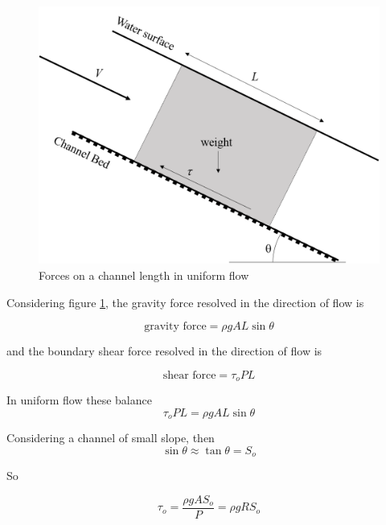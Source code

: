 \documentclass[a4paper, 12pt, british]{article} %
\numberwithin{equation}{section}
\numberwithin{figure}{section}
\numberwithin{table}{section}
\begin{document}
\begin{figure}[H]
	\centering
	\includegraphics[scale=0.5]{./images/uniform_flow_section_2018.png}
	\caption{Forces on a channel length in uniform flow}
	\label{fig:171}
\end{figure} 
Considering figure \ref{fig:171}, the gravity force resolved in the direction of flow is

\begin{equation}
\text{gravity force} = \rho g A L \sin \theta
\end{equation}
 

and the boundary shear force resolved in the direction of flow is 

\begin{equation}
\text{shear force} = \tau_o P L
\end{equation}
 

In uniform flow these balance
 \begin{equation}
  \tau_o P L = \rho g A L \sin \theta
 \end{equation}
 


Considering a channel of small slope, then
 \begin{equation}
\sin \theta \approx \tan \theta = S_o
\end{equation}


So

 \begin{equation}
\tau_o = \frac{\rho g A S_o}{P} = \rho g R S_o
\label{eq:tau_o}
\end{equation}
\end{document}

